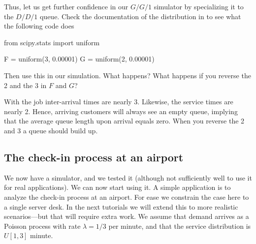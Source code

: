 \begin{exercise}
 Thus, let us get further confidence in our $G/G/1$ simulator by specializing it to the $D/D/1$ queue. Check the documentation of the  distribution in  to see what the following code does
  \begin{pyverbatim}
from scipy.stats import uniform

F = uniform(3, 0.00001)
G = uniform(2, 0.00001)
\end{pyverbatim}

Then use this in our simulation. What happens? What happens if you reverse the 2 and the 3 in $F$ and $G$?
\begin{solution}
  With  the job inter-arrival times are nearly 3.
  Likewise, the service times are nearly 2.
  Hence, arriving customers will always see an empty queue, implying that the average queue length upon arrival equals zero.
  When you reverse the 2 and 3 a queue should build up.
\end{solution}
\end{exercise}


\subsection{The check-in process at an airport}
\label{sec:check-in-process-at}

We now have a simulator, and we tested it (although not sufficiently well to use it for real applications).
We can now start using it.
A simple application is to analyze the check-in process at an airport.
For ease we constrain the case here to a single server desk.
In the next tutorials we will extend this to more realistic scenarios---but that will require extra work.
We assume that demand arrives as a Poisson process with rate $\lambda=1/3$ per minute, and that the service distribution is $U[1,3]$ minute.


